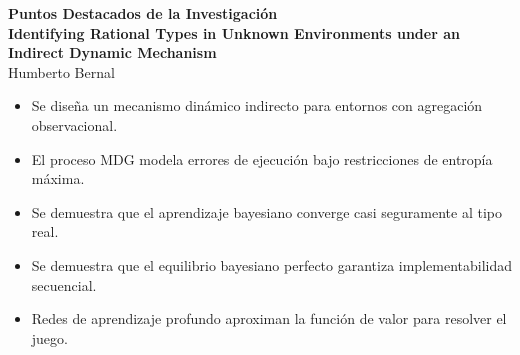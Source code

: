 \documentclass[12pt]{article}
\begin{document}
\doublespacing

\begin{center}
\textbf{Puntos Destacados de la Investigación} \\
\vspace{1em}
\textbf{Identifying Rational Types in Unknown Environments under an Indirect Dynamic Mechanism} \\
Humberto Bernal
\end{center}

\vspace{2em}

\begin{itemize}
    \item Se diseña un mecanismo dinámico indirecto para entornos con agregación observacional.
    \item El proceso MDG modela errores de ejecución bajo restricciones de entropía máxima.
    \item Se demuestra que el aprendizaje bayesiano converge casi seguramente al tipo real.
    \item Se demuestra que el equilibrio bayesiano perfecto garantiza implementabilidad secuencial.
    \item Redes de aprendizaje profundo aproximan la función de valor para resolver el juego.
\end{itemize}
\end{document}

